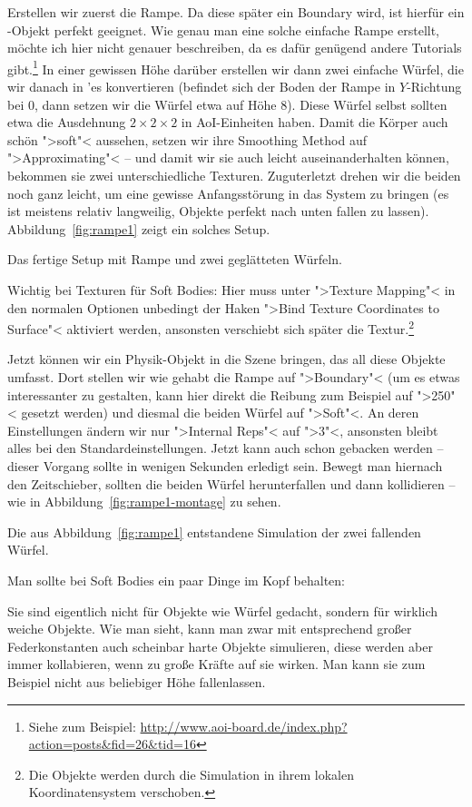 \documentclass[10pt,DIV=14,a4paper]{scrartcl}
\begin{document}
Erstellen wir zuerst die Rampe. Da diese später ein Boundary wird, ist
hierfür ein \PolyMesh-Objekt perfekt geeignet. Wie genau man eine solche
einfache Rampe erstellt, möchte ich hier nicht genauer beschreiben, da
es dafür genügend andere Tutorials gibt.\footnote{Siehe zum Beispiel:
\url{http://www.aoi-board.de/index.php?action=posts&fid=26&tid=16}} In
einer gewissen Höhe darüber erstellen wir dann zwei einfache Würfel, die
wir danach in \TriMesh'es konvertieren (befindet sich der Boden der
Rampe in $Y$-Richtung bei $0$, dann setzen wir die Würfel etwa auf Höhe
$8$). Diese Würfel selbst sollten etwa die Ausdehnung $2 \times 2 \times
2$ in AoI-Einheiten haben. Damit die Körper auch schön ">soft"<
aussehen, setzen wir ihre Smoothing Method auf ">Approximating"< -- und
damit wir sie auch leicht auseinanderhalten können, bekommen sie zwei
unterschiedliche Texturen.  Zuguterletzt drehen wir die beiden noch ganz
leicht, um eine gewisse Anfangsstörung in das System zu bringen (es ist
meistens relativ langweilig, Objekte perfekt nach unten fallen zu
lassen). Abbildung~\ref{fig:rampe1} zeigt ein solches Setup.

{Das fertige Setup mit Rampe und zwei geglätteten Würfeln.}

Wichtig bei Texturen für Soft Bodies: Hier muss unter ">Texture
Mapping"< in den normalen \aoi Optionen unbedingt der Haken ">Bind
Texture Coordinates to Surface"< aktiviert werden, ansonsten verschiebt
sich später die Textur.\footnote{Die Objekte werden durch die Simulation
in ihrem lokalen Koordinatensystem verschoben.}

Jetzt können wir ein Physik-Objekt in die Szene bringen, das all diese
Objekte umfasst. Dort stellen wir wie gehabt die Rampe auf ">Boundary"<
(um es etwas interessanter zu gestalten, kann hier direkt die Reibung
zum Beispiel auf ">250"< gesetzt werden) und diesmal die beiden Würfel
auf ">Soft"<. An deren Einstellungen ändern wir nur ">Internal Reps"<
auf ">3"<, ansonsten bleibt alles bei den Standardeinstellungen. Jetzt
kann auch schon gebacken werden -- dieser Vorgang sollte in wenigen
Sekunden erledigt sein. Bewegt man hiernach den Zeitschieber, sollten
die beiden Würfel herunterfallen und dann kollidieren -- wie in
Abbildung~\ref{fig:rampe1-montage} zu sehen.

{Die aus Abbildung~\ref{fig:rampe1} entstandene Simulation der zwei
fallenden Würfel.}

Man sollte bei Soft Bodies ein paar Dinge im Kopf behalten:
\itA
	\item Sie sind eigentlich nicht für Objekte wie Würfel gedacht,
	sondern für wirklich weiche Objekte. Wie man sieht, kann man zwar
	mit entsprechend großer Federkonstanten auch scheinbar harte Objekte
	simulieren, diese werden aber immer kollabieren, wenn zu große
	Kräfte auf sie wirken. Man kann sie zum Beispiel nicht aus
	beliebiger Höhe fallenlassen.
\end{document}
